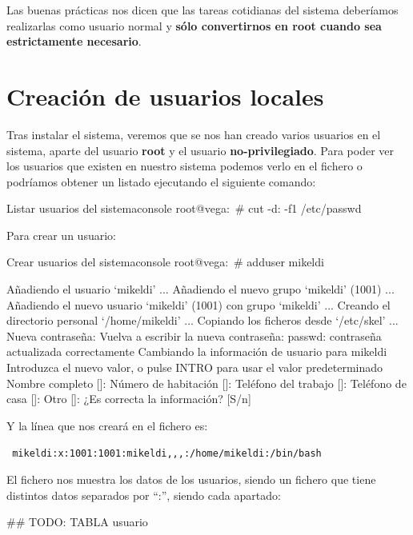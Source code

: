 \documentclass{../../../yukibook.cls/yukibook}
\begin{document}
Las buenas prácticas nos dicen que las tareas cotidianas del sistema deberíamos realizarlas como usuario normal y \textbf{sólo convertirnos en root cuando sea estrictamente necesario}.

\section{Creación de usuarios locales}

Tras instalar el sistema, veremos que se nos han creado varios usuarios en el sistema, aparte del usuario \textbf{root} y el usuario \textbf{no-privilegiado}. Para poder ver los usuarios que existen en nuestro sistema podemos verlo en el fichero    o podríamos obtener un listado ejecutando el siguiente comando:

\begin{mycode}{Listar usuarios del sistema}{console}{}
root@vega:~# cut -d: -f1 /etc/passwd
\end{mycode}

Para crear un usuario:

\begin{mycode}{Crear usuarios del sistema}{console}{\small}
root@vega:~# adduser mikeldi

Añadiendo el usuario `mikeldi' ...
Añadiendo el nuevo grupo `mikeldi' (1001) ...
Añadiendo el nuevo usuario `mikeldi' (1001) con grupo `mikeldi' ...
Creando el directorio personal `/home/mikeldi' ...
Copiando los ficheros desde `/etc/skel' ...
Nueva contraseña:
Vuelva a escribir la nueva contraseña:
passwd: contraseña actualizada correctamente
Cambiando la información de usuario para mikeldi
Introduzca el nuevo valor, o pulse INTRO para usar el valor predeterminado
    Nombre completo []:
    Número de habitación []:
    Teléfono del trabajo []:
    Teléfono de casa []:
    Otro []:
¿Es correcta la información? [S/n]
\end{mycode}

Y la línea que nos creará en el fichero     es:
\begin{tcolorbox}[colback=white,title=Ejemplo de usaurio en “/etc/passwd”]
 \texttt{ mikeldi:x:1001:1001:mikeldi,,,:/home/mikeldi:/bin/bash }
\end{tcolorbox}

El fichero   nos muestra los datos de los usuarios, siendo un fichero que tiene distintos datos separados por “:”, siendo cada apartado:

\#\# TODO: TABLA usuario
\end{document}
